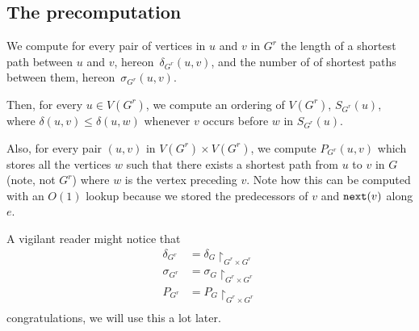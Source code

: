 \subsection{The precomputation}
We compute for every pair of vertices in $u$ and $v$ in $G^r$ the
length of a shortest path between $u$ and $v$, hereon~$\delta_{G^r}(u, v)$,
and the number of of shortest paths between them, hereon~$\sigma_{G^r}(u, v)$.

Then, for every $u \in V(G^r)$, we compute an ordering of $V(G^r)$,
$S_{G^r}(u)$, where $\delta(u, v) \leq \delta(u, w)$ whenever
$v$ occurs before $w$ in $S_{G^r}(u)$.

Also, for every pair $(u, v)$ in $V(G^r) \times V(G^r)$, we compute
$P_{G^r}(u, v)$ which stores all the vertices $w$ such that there exists
a shortest path from $u$ to $v$ in $G$ (note, not $G^r$) where $w$ is the
vertex preceding $v$.
Note how this can be computed with an $O(1)$ lookup because we stored
the predecessors of $v$ and $\texttt{next}(v)$ along $e$.

A vigilant reader might notice that
\begin{align*}
\delta_{G^r} &= \delta_{G}\restriction_{G^r \times G^r}\\
\sigma_{G^r} &= \sigma_{G}\restriction_{G^r \times G^r}\\
P_{G^r}      &= P_{G}\restriction_{G^r \times G^r}\\
\end{align*}
congratulations, we will use this a lot later.
